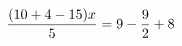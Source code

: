 \documentclass[preview]{standalone}
\begin{document}
\begin{align*}
\special{dvisvgm:raw <g id='unique000'>}\frac{(10 + 4 - 15) x}{5} = 9 - \frac{9}{2} + 8\special{dvisvgm:raw </g>}
\end{align*}
\end{document}
